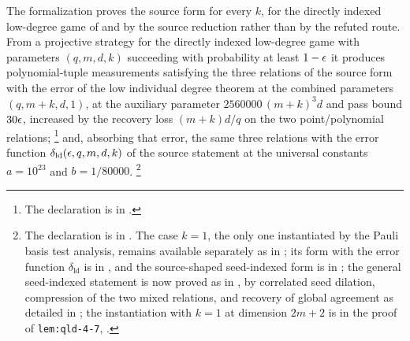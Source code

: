 \documentclass[11pt]{article}
\begin{document}
The formalization proves the source form for every $k$, for the directly
indexed low-degree game of \cite{gap:qpbt_ld-dimension-divisibility} and by the
source reduction rather than by the refuted route.  From a projective strategy for the
directly indexed low-degree game with parameters $(q,m,d,k)$ succeeding with
probability at least $1 - \epsilon$ it produces polynomial-tuple measurements
satisfying the three relations of the source form with the error of the low
individual degree theorem at the combined parameters $(q, m+k, d, 1)$, at the
auxiliary parameter $2560000\,(m+k)^{3}d$ and pass bound $30\epsilon$, increased by
the recovery loss $(m+k)d/q$ on the two point/polynomial relations;%
\footnote{The declaration is
 in
.}
and, absorbing that error, the same three relations with the error function
$\delta_{\mathrm{ld}}(\epsilon,q,m,d,k)$ of the source statement at the universal
constants $a = 10^{23}$ and $b = 1/80000$.%
\footnote{The declaration is  in
.  The case
$k = 1$, the only one instantiated by the Pauli basis test analysis, remains
available separately as
in ;
its form with the error function $\delta_{\mathrm{ld}}$ is
 in
, and the
source-shaped seed-indexed form is
 in
;
the general seed-indexed statement is now proved as
 in
, by correlated seed
dilation, compression of the two mixed relations, and recovery of global
agreement as detailed in \cite{gap:qpbt_ld-dimension-divisibility};
the instantiation with $k = 1$ at dimension $2m+2$ is in the proof of
\texttt{lem:qld-4-7}, .}
\end{document}
